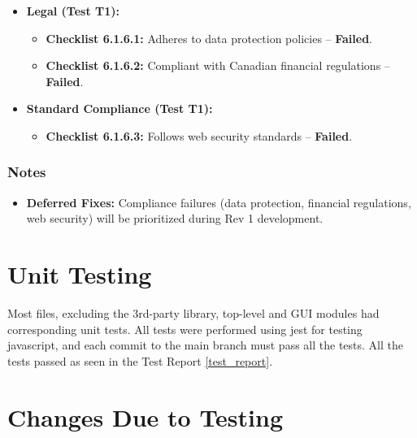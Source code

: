 \documentclass[12pt, titlepage]{article}
\begin{document}
\begin{itemize}
    \item \textbf{Legal (Test T1):}  
    \begin{itemize}
        \item \textbf{Checklist 6.1.6.1:} Adheres to data protection policies – \textbf{Failed}.  
        \item \textbf{Checklist 6.1.6.2:} Compliant with Canadian financial regulations – \textbf{Failed}.  
    \end{itemize}
    
    \item \textbf{Standard Compliance (Test T1):}  
    \begin{itemize}
        \item \textbf{Checklist 6.1.6.3:} Follows web security standards – \textbf{Failed}.  
    \end{itemize}
\end{itemize}

\subsubsection*{Notes}  
\begin{itemize}
    \item \textbf{Deferred Fixes:} Compliance failures (data protection, financial regulations, web security) will be prioritized during Rev 1 development.  
\end{itemize}

\section{Unit Testing}

Most files, excluding the 3rd-party library, top-level and GUI modules had corresponding unit tests.
All tests were performed using jest for testing javascript, and each commit to the main branch must pass all the tests.
All the tests passed as seen in the Test Report \ref{test_report}.

\section{Changes Due to Testing}

\end{document}
